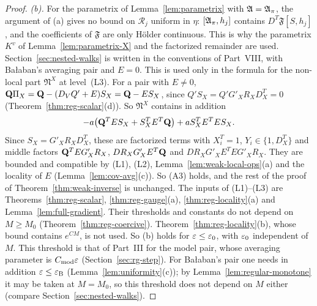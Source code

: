 \begin{proof}
\emph{(b).} For the parametrix of Lemma~\ref{lem:parametrix} with $\mathfrak A=\mathfrak A_\pi$, the argument of (a) gives no bound on $\mathcal R_j$ uniform in $\eta$: $[\mathfrak A_\pi,h_j]$ contains $D^T\mathfrak F[S,h_j]$, and the coefficients of $\mathfrak F$ are only H\"older continuous. This is why the parametrix $K^v$ of Lemma~\ref{lem:parametrix-X} and the factorized remainder are used. Section~\ref{sec:nested-walks} is written in the conventions of Part~VIII, with Ba\l aban's averaging pair and $E=0$. This is used only in the formula for the non-local part $\mathfrak N^X$ at level~(L3). For a pair with $E\ne0$, $\mathbf Q\Pi_X=\mathbf Q-(D_VQ'+E)S_X=\mathbf Q-ES_X$, since $Q'S_X=Q'G'_XR_XD^T_X=0$ (Theorem~\ref{thm:reg-scalar}(d)). So $\mathfrak N^X$ contains in addition
\[
-a\big(\mathbf Q^TES_X+S_X^TE^T\mathbf Q\big)+aS_X^TE^TES_X .
\]
Since $S_X=G'_XR_XD^T_X$, these are factorized terms with $X_i^T=1$, $Y_i\in\{1,D^T_X\}$ and middle factors $\mathbf Q^TEG'_XR_X$, $DR_XG'_XE^T\mathbf Q$ and $DR_XG'_XE^TEG'_XR_X$. They are bounded and compatible by (L1), (L2), Lemma~\ref{lem:weak-local-ops}(a) and the locality of $E$ (Lemma~\ref{lem:cov-avg}(c)). So (A3) holds, and the rest of the proof of Theorem~\ref{thm:weak-inverse} is unchanged. The inputs of (L1)--(L3) are Theorems~\ref{thm:reg-scalar}, \ref{thm:reg-gauge}(a), \ref{thm:reg-locality}(a) and Lemma~\ref{lem:full-gradient}. Their thresholds and constants do not depend on $M\ge M_0$ (Theorem~\ref{thm:reg-coercive}). Theorem~\ref{thm:reg-locality}(b), whose bound contains $e^{CM}$, is not used. So (b) holds for $\varepsilon\le\varepsilon_0$, with $\varepsilon_0$ independent of $M$. This threshold is that of Part~III for the model pair, whose averaging parameter is $C_{\rm mod}\varepsilon$ (Section~\ref{sec:rg-step}). For Ba\l aban's pair one needs in addition $\varepsilon\le\varepsilon_{\rm B}$ (Lemma~\ref{lem:uniformity}(c)); by Lemma~\ref{lem:regular-monotone} it may be taken at $M=M_0$, so this threshold does not depend on $M$ either (compare Section~\ref{sec:nested-walks}).
\end{proof}

